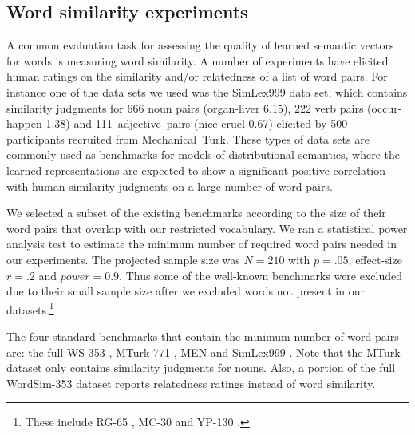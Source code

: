 \subsection{Word similarity experiments}
\label{sec:experiments-wsj}
A common evaluation task for assessing the quality of learned semantic
vectors for words is measuring word similarity. A number of
experiments have elicited human ratings on the similarity and/or
relatedness of a list of word pairs. For instance one of the data sets
we used was the SimLex999 data set, which contains similarity judgments
for 666 noun pairs (organ-liver 6.15), 222 verb pairs (occur-happen 1.38)
and \mbox{111 adjective pairs} (nice-cruel 0.67) elicited by 500 participants
recruited from \mbox{Mechanical Turk}\label{rev:similarity_example}.
These types of data sets are commonly used as
benchmarks for models of distributional semantics, where the learned
representations are expected to show a significant positive
correlation with human similarity judgments on a large number of word
pairs.


We selected a subset of the existing benchmarks according to the size
of their word pairs that overlap with our restricted vocabulary. We
ran a statistical power analysis test to estimate the minimum number
of required word pairs needed in our experiments. The projected sample
size was $N=210$ with $p=.05$, effect-size $r=.2$ and
$\mathit{power}=0.9$.  Thus some of the well-known benchmarks were
excluded due to their small sample size after we excluded words not
present in our datasets.\footnote{These include RG-65
  \citep{rubenstein1965contextual}, MC-30 \citep{miller1991contextual}
  and YP-130 \citep{yang2006verb}.}


The four standard benchmarks that contain the minimum number of word
pairs are: the full WS-353 \citep{finkelstein2001placing}, MTurk-771
\citep{radinsky2011word}, MEN \citep{bruni2014multimodal} and
SimLex999 \citep{hill2015simlex}. Note that the MTurk dataset only
contains similarity judgments for nouns. Also, a portion of the full
WordSim-353 dataset reports relatedness ratings instead of word
similarity.

